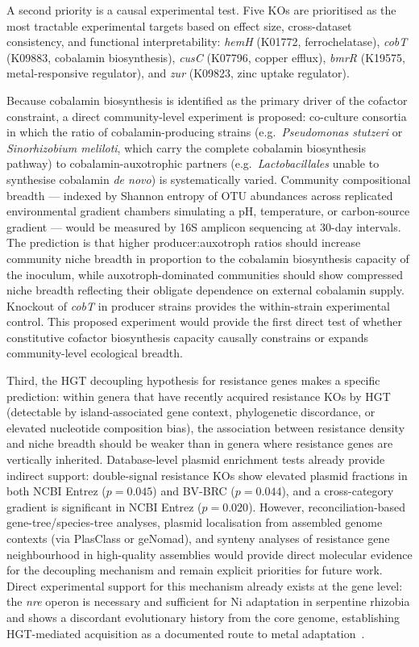 \documentclass[times]{zHenriquesLab-StyleBioRxiv}
\begin{document}
A second priority is a causal experimental test. Five KOs are prioritised as
the most tractable experimental targets based on effect size, cross-dataset
consistency, and functional interpretability: \textit{hemH} (K01772,
ferrochelatase), \textit{cobT} (K09883, cobalamin biosynthesis), \textit{cusC}
(K07796, copper efflux), \textit{bmrR} (K19575, metal-responsive regulator),
and \textit{zur} (K09823, zinc uptake regulator).

Because cobalamin biosynthesis is identified as the primary driver of the
cofactor constraint, a direct community-level experiment is proposed: co-culture
consortia in which the ratio of cobalamin-producing strains
(e.g.\ \textit{Pseudomonas stutzeri} or \textit{Sinorhizobium meliloti}, which
carry the complete cobalamin biosynthesis pathway) to cobalamin-auxotrophic
partners (e.g.\ \textit{Lactobacillales} unable to synthesise cobalamin
\textit{de novo}) is systematically varied. Community compositional breadth ---
indexed by Shannon entropy of OTU abundances across replicated environmental
gradient chambers simulating a pH, temperature, or carbon-source gradient ---
would be measured by 16S amplicon sequencing at 30-day intervals. The
prediction is that higher producer:auxotroph ratios should increase community
niche breadth in proportion to the cobalamin biosynthesis capacity of the
inoculum, while auxotroph-dominated communities should show compressed niche
breadth reflecting their obligate dependence on external cobalamin supply.
Knockout of \textit{cobT} in producer strains provides the within-strain
experimental control. This proposed experiment would provide the first direct
test of whether constitutive cofactor biosynthesis capacity causally constrains
or expands community-level ecological breadth.

Third, the HGT decoupling hypothesis for resistance genes makes a specific
prediction: within genera that have recently acquired resistance KOs by HGT
(detectable by island-associated gene context, phylogenetic discordance, or
elevated nucleotide composition bias), the association between resistance density
and niche breadth should be weaker than in genera where resistance genes are
vertically inherited. Database-level plasmid enrichment tests already provide
indirect support: double-signal resistance KOs show elevated plasmid fractions in
both NCBI Entrez ($p = 0.045$) and BV-BRC ($p = 0.044$), and a cross-category
gradient is significant in NCBI Entrez ($p = 0.020$). However, reconciliation-based
gene-tree/species-tree analyses, plasmid localisation from assembled genome contexts
(via PlasClass or geNomad), and synteny analyses of resistance gene neighbourhood
in high-quality assemblies would provide direct molecular evidence for the decoupling
mechanism and remain explicit priorities for future work. Direct experimental support
for this mechanism already exists at the gene level: the \textit{nre} operon is
necessary and sufficient for Ni adaptation in serpentine rhizobia and shows a
discordant evolutionary history from the core genome, establishing HGT-mediated
acquisition as a documented route to metal adaptation~\cite{kehlet2024}.
\end{document}
